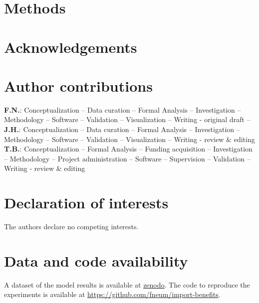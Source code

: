 \documentclass[5p,9pt]{elsarticle}
\renewcommand{\ttdefault}{\sfdefault}
\begin{document}


\section*{Methods}

\label{sec:methods}



\section*{Acknowledgements}



\section*{Author contributions}


\textbf{F.N.}:
Conceptualization --
Data curation --
Formal Analysis --
Investigation --
Methodology --
Software --
Validation --
Visualization --
Writing - original draft --
\textbf{J.H.}:
Conceptualization --
Data curation --
Formal Analysis --
Investigation --
Methodology --
Software --
Validation --
Visualization --
Writing - review \& editing
\textbf{T.B.}:
Conceptualization --
Formal Analysis --
Funding acquisition --
Investigation --
Methodology --
Project administration --
Software --
Supervision --
Validation --
Writing - review \& editing

\section*{Declaration of interests}

The authors declare no competing interests.

\section*{Data and code availability}

A dataset of the model results is available at \url{zenodo}.
The code to reproduce the experiments is available at \url{https://github.com/fneum/import-benefits}.

\renewcommand{\ttdefault}{\sfdefault}
% 


\setcounter{LastMainFigure}{\value{figure}}
\end{document}
